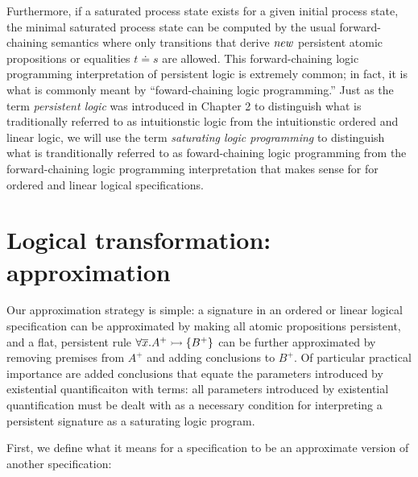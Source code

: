 Furthermore, if a saturated process state exists for a given initial
process state, the minimal saturated process state can be computed by
the usual forward-chaining semantics where only transitions that
derive ${\it new}$ persistent atomic propositions or equalities $t
\doteq s$ are allowed. This forward-chaining logic programming
interpretation of persistent logic is extremely common; in fact, it is
what is commonly meant by ``foward-chaining logic programming.'' Just
as the term {\it persistent logic} was introduced in Chapter 2 to
distinguish what is traditionally referred to as intuitionstic logic
from the intuitionstic ordered and linear logic, we will use the term
{\it saturating logic programming} to distinguish what is
tranditionally referred to as foward-chaining logic programming from
the forward-chaining logic programming interpretation that makes sense
for for ordered and linear logical specifications.

\section{Logical transformation: approximation}
\label{sec:abstraction}

Our approximation strategy is simple: a signature in an ordered or
linear logical specification can be approximated by making all atomic
propositions persistent, and a flat, persistent rule $\forall
\overline{x}. A^+ \rightarrowtail \{ B^+ \}$ can be further approximated by
removing premises from $A^+$ and adding conclusions to $B^+$. Of
particular practical importance are added conclusions that equate the
parameters introduced by existential quantificaiton with terms: all
parameters introduced by existential quantification must be dealt with
as a necessary condition for interpreting a persistent signature as a
saturating logic program.

First, we define what it means for a specification to be an approximate
version of another specification:

